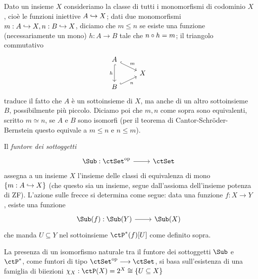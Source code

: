 \begin{definition}\label{def_fun_sub_onset}
	Dato un insieme \(X\) consideriamo la classe di tutti i monomorfismi di codominio \(X\), cioè le funzioni iniettive \(A\hookrightarrow X\); dati due monomorfismi \(m : A\hookrightarrow X, n : B\hookrightarrow X\), diciamo che \(m\le n\) se esiste una funzione (necessariamente un mono) \(h : A\to B\) tale che \(n\circ h = m\); il triangolo commutativo
	\[\begin{tikzcd}[row sep=2mm]
			A \\
			& X \\
			B
			\arrow["m", hook, from=1-1, to=2-2]
			\arrow["h"', hook, from=1-1, to=3-1]
			\arrow["n"', hook, from=3-1, to=2-2]
		\end{tikzcd}\]
	traduce il fatto che \(A\) è un sottoinsieme di \(X\), ma anche di un altro sottoinsieme \(B\), possibilmente più piccolo. Diciamo poi che \(m,n\) come sopra sono equivalenti, scritto \(m\simeq n\), se \(A\) e \(B\) sono isomorfi (per il teorema di Cantor-Schröder-Bernstein questo equivale a \(m\le n\) e \(n\le m\)).

	Il \emph{funtore dei sottoggetti}
	\[\dmFun{\Sub}{\ctSet^\op}{\ctSet}\]
	assegna a un insieme \(X\) l'insieme delle classi di equivalenza di mono \(\{m : A\hookrightarrow X\}\) (che questo sia un insieme, segue dall'assioma dell'insieme potenza di ZF). L'azione sulle frecce si determina come segue: data una funzione \(f : X\to Y\), esiste una funzione
	\[\dmFun{\Sub(f)}{\Sub(Y)}{\Sub(X)}\]
	che manda \(U\subseteq Y\) nel sottoinsieme \(\ctP^*(f)[U]\) come definito sopra.

	La presenza di un isomorfismo naturale tra il funtore dei sottoggetti \(\Sub\) e \(\ctP^*\), come funtori di tipo \(\ctSet^\op\fun\ctSet\), si basa sull'esistenza di una famiglia di biiezioni \(\chi_X : \ctP(X) = \pow X \cong \{U\subseteq X\}\)
\end{definition}
\begin{definition}\label{def_sottoggetto}
\end{definition}
\begin{definition}\label{def_cat_ben_potenziata}
\end{definition}
